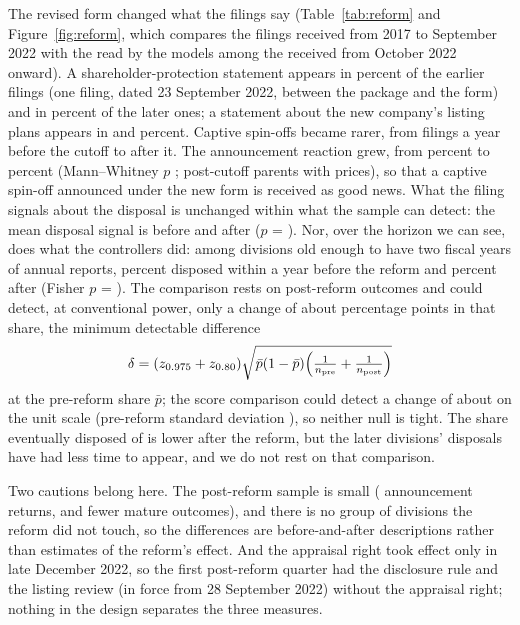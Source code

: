 The revised form changed what the filings say (Table~\ref{tab:reform} and Figure~\ref{fig:reform}, which compares the filings received from 2017 to September 2022 with the \NPostFilings{} read by the models among the \NPostAll{} received from October 2022 onward). A shareholder-protection statement appears in \ProtectPre{} percent of the earlier filings (one filing, dated 23 September 2022, between the package and the form) and in \ProtectPost{} percent of the later ones; a statement about the new company's listing plans appears in \ListingPre{} and \ListingPost{} percent. Captive spin-offs became rarer, from \FilingsPerYearPre{} filings a year before the cutoff to \FilingsPerYearPost{} after it. The announcement reaction grew, from \CarPre{} percent to \CarPost{} percent (Mann--Whitney $p$ \CarPrePostP; \NPost{} post-cutoff parents with prices), so that a captive spin-off announced under the new form is received as good news. What the filing signals about the disposal is unchanged within what the sample can detect: the mean disposal signal is \ScorePre{} before and \ScorePost{} after ($p$ = \ScorePrePostP). Nor, over the horizon we can see, does what the controllers did: among divisions old enough to have two fiscal years of annual reports, \EarlyPre{} percent disposed within a year before the reform and \EarlyPost{} percent after (Fisher $p$ = \EarlyPrePostP). The comparison rests on \NPostOutcomes{} post-reform outcomes and could detect, at conventional power, only a change of about \MDEEarlyPP{} percentage points in that share, the minimum detectable difference
\begin{equation}\label{eq:mde}
\delta = (z_{0.975} + z_{0.80})\sqrt{\bar p(1-\bar p)\Bigl(\tfrac{1}{n_{\mathrm{pre}}} + \tfrac{1}{n_{\mathrm{post}}}\Bigr)}
\end{equation}
at the pre-reform share $\bar p$; the score comparison could detect a change of about \MDEScore{} on the unit scale (pre-reform standard deviation \ScoreSDPre), so neither null is tight. The share eventually disposed of is lower after the reform, but the later divisions' disposals have had less time to appear, and we do not rest on that comparison.

Two cautions belong here. The post-reform sample is small (\NPost{} announcement returns, and fewer mature outcomes), and there is no group of divisions the reform did not touch, so the differences are before-and-after descriptions rather than estimates of the reform's effect. And the appraisal right took effect only in late December 2022, so the first post-reform quarter had the disclosure rule and the listing review (in force from 28 September 2022) without the appraisal right; nothing in the design separates the three measures.

